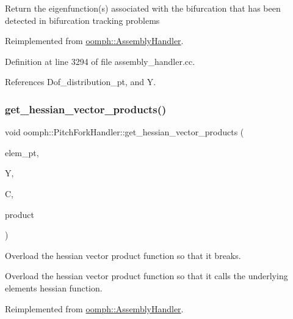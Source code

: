Return the eigenfunction(s) associated with the bifurcation that has been detected in bifurcation tracking problems 

Reimplemented from \hyperlink{classoomph_1_1AssemblyHandler_a6d614b1b3809d0eb7ceb393e3ae9594f}{oomph\+::\+Assembly\+Handler}.



Definition at line 3294 of file assembly\+\_\+handler.\+cc.



References Dof\+\_\+distribution\+\_\+pt, and Y.

\mbox{\label{classoomph_1_1PitchForkHandler_a85e7dba2d21c9fe95a575a115cf3ee9f}} 
\subsubsection{\texorpdfstring{get\+\_\+hessian\+\_\+vector\+\_\+products()}{get\_hessian\_vector\_products()}}
{\footnotesize\ttfamily void oomph\+::\+Pitch\+Fork\+Handler\+::get\+\_\+hessian\+\_\+vector\+\_\+products (\begin{DoxyParamCaption}\item[{\hyperlink{classoomph_1_1GeneralisedElement}{Generalised\+Element} $\ast$const \&}]{elem\+\_\+pt,  }\item[{\hyperlink{classoomph_1_1Vector}{Vector}$<$ double $>$ const \&}]{Y,  }\item[{\hyperlink{classoomph_1_1DenseMatrix}{Dense\+Matrix}$<$ double $>$ const \&}]{C,  }\item[{\hyperlink{classoomph_1_1DenseMatrix}{Dense\+Matrix}$<$ double $>$ \&}]{product }\end{DoxyParamCaption})\hspace{0.3cm}{\ttfamily [virtual]}}



Overload the hessian vector product function so that it breaks. 

Overload the hessian vector product function so that it calls the underlying element\textquotesingle{}s hessian function. 

Reimplemented from \hyperlink{classoomph_1_1AssemblyHandler_a296bef49838d23522bb660c4c5207f03}{oomph\+::\+Assembly\+Handler}.



